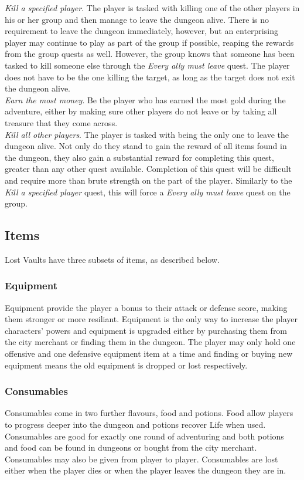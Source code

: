 \documentclass[a4paper]{article}
\begin{document}
\textit{Kill a specified player}. The player is tasked with killing one of the other players in his or her group and then manage to leave the dungeon alive. There is no requirement to leave 
the dungeon immediately, however, but an enterprising player may continue to play as part of the group if possible, reaping the rewards from the group quests as well. However, the group 
knows that someone has been tasked to kill someone else through the \textit{Every ally must leave} quest. The player does not have to be the one killing the target, as long as the target 
does not exit the dungeon alive.\\
\textit{Earn the most money}. Be the player who has earned the most gold during the adventure, either by making sure other players do not leave or by taking all treasure that they come across.\\
\textit{Kill all other players}. The player is tasked with being the only one to leave the dungeon alive. Not only do they stand to gain the reward of all items found in the dungeon, they also gain 
a substantial reward for completing this quest, greater than any other quest available. Completion of this quest will be difficult and require more than brute strength on the part of the player. 
Similarly to the \textit{Kill a specified player} quest, this will force a \textit{Every ally must leave} quest on the group.
\subsection{Items}
Lost Vaults have three subsets of items, as described below.

\subsubsection{Equipment}
Equipment provide the player a bonus to their attack or defense score, making them stronger or more resiliant. Equipment is the only way to increase the player characters' powers and 
equipment is upgraded either by purchasing them from the city merchant or finding them in the dungeon. The player may only hold one offensive and one defensive equipment item at a time and 
finding or buying new equipment means the old equipment is dropped or lost respectively.

\subsubsection{Consumables}
Consumables come in two further flavours, food and potions. Food allow players to progress deeper into the dungeon and potions recover Life when used. Consumables are good for exactly 
one round of adventuring and both potions and food can be found in dungeons or bought from the city merchant. Consumables may also be given from player to player. Consumables are lost 
either when the player dies or when the player leaves the dungeon they are in.
\end{document}
